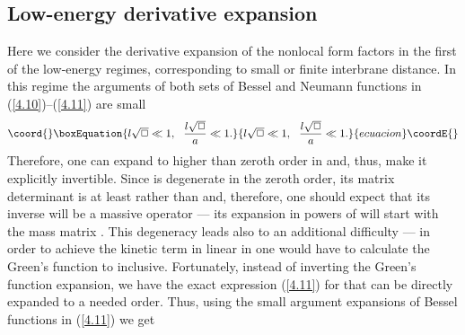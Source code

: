 \documentclass[a4paper,preprint,nofootinbib,
                 showpacs,preprintnumbers,amsmath,amssymb]{revtex4}
\begin{document}
\subsection{Low-energy derivative expansion  
\label{particle}} 
Here we consider the derivative expansion of the nonlocal form factors 
in the first of the low-energy regimes, corresponding to 
small or finite interbrane distance. In this regime the arguments 
of both sets of Bessel and Neumann functions in 
(\ref{4.10})--(\ref{4.11}) are small 
    \begin{equation}\coord{}\boxEquation{ 
    l\sqrt\Box\ll 1,\,\,\,\, \frac{l\sqrt\Box}a\ll 1.  \label{4.19} 
    }{ 
    l\sqrt\Box\ll 1,\,\,\,\, \frac{l\sqrt\Box}a\ll 1.  }{ecuacion}\coordE{}\end{equation} 
Therefore, one can expand \coordHE{} to higher than 
zeroth order in \myHighlight{$\Box$}\coordHE{} and, thus, make it explicitly invertible. 
Since \coordHE{} is degenerate in the zeroth order, its 
matrix determinant is at least \coordHE{} rather than 
\coordHE{} and, therefore, one should expect that its inverse 
\coordHE{} will be a massive operator 
--- its expansion in powers of \myHighlight{$\Box$}\coordHE{} will start with the mass 
matrix \coordHE{}. This degeneracy leads also to an additional 
difficulty --- in order to achieve the kinetic term in \coordHE{} linear in \myHighlight{$\Box$}\coordHE{} one would have to calculate the Green's 
function \coordHE{} to \coordHE{} inclusive.  
Fortunately, instead of inverting the Green's function expansion, 
we have the exact expression (\ref{4.11}) for \coordHE{} that 
can be directly expanded to a needed order. Thus, using the small  
argument expansions of Bessel functions in (\ref{4.11}) we get 
\end{document}
